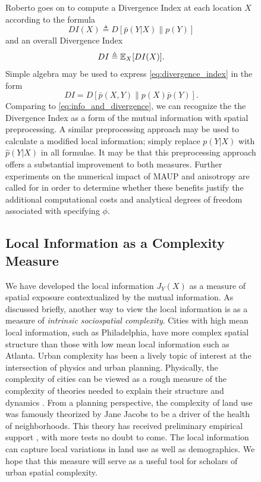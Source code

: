 \documentclass[english]{scrartcl}
\begin{document}
\begin{figure}
		Roberto goes on to compute a Divergence Index at each location $X$ according to the formula 
		\begin{equation*}
			DI(X) \triangleq D[\bar{p}(Y|X)\|p(Y)] 
		\end{equation*}
		and an overall Divergence Index 
		\begin{equation}
			DI \triangleq \mathbb{E}_X[DI(X)]. \label{eq:divergence_index} 
		\end{equation}
		Simple algebra may be used to express \eqref{eq:divergence_index} in the form 
		\begin{equation*}
			DI = D[\bar{p}(X,Y) \| p(X)\bar{p}(Y)]. 
		\end{equation*}
		Comparing to \eqref{eq:info_and_divergence}, we can recognize the the Divergence Index as a form of the mutual information with spatial preprocessing. A similar preprocessing approach may be used to calculate a modified local information; simply replace $p(Y|X)$ with $\hat{p}(Y|X)$ in all formulae. It may be that this preprocessing approach offers a substantial improvement to both measures. Further experiments on the numerical impact of MAUP and anisotropy are called for in order to determine whether these benefits justify the additional computational costs and analytical degrees of freedom associated with specifying $\phi$.  


	\subsection*{Local Information as a Complexity Measure}

		We have developed the local information $J_Y(X)$ as a measure of spatial exposure contextualized by the mutual information. As discussed briefly, another way to view the local information is as a measure of \emph{intrinsic sociospatial complexity}. Cities with high mean local information, such as Philadelphia, have more complex spatial structure than those with low mean local information such as Atlanta. Urban complexity has been a lively topic of interest at the intersection of physics and urban planning. Physically, the complexity of cities can be viewed as a rough measure of the complexity of theories needed to explain their structure and dynamics \cite{Bettencourt2015}. From a planning perspective, the complexity of land use was famously theorized by Jane Jacobs \cite{Jacobs1992} to be a driver of the health of neighborhoods. This theory has received preliminary empirical support \cite{DeNadai2016a}, with more tests no doubt to come. The local information can capture local variations in land use as well as demographics. We hope that this measure will serve as a useful tool for scholars of urban spatial complexity.  



\end{figure}
\end{document}
